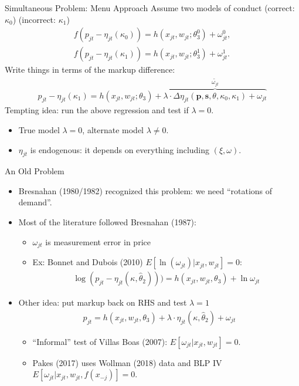 \documentclass[xcolor=pdftex,dvipsnames,table,mathserif,aspectratio=169]{beamer}
\begin{document}
\begin{frame}{Simultaneous Problem: Menu Approach}
Assume two models of conduct (correct: $\kappa_0$) (incorrect: $\kappa_1$)
\begin{align*}
f(p_{jt} -\eta_{jt}(\kappa_0))= h(x_{jt},w_{jt};\theta_3^0)+  \omega_{jt}^{0},\\
f(p_{jt} -\eta_{jt}(\kappa_1))= h(x_{jt},w_{jt};\theta_3^1)+  \omega_{jt}^{1}.
\end{align*}
Write things in terms of the markup difference:
\begin{align*}
p_{jt} -\eta_{jt}(\kappa_1)= h(x_{jt},w_{jt};\theta_3)+ \overbrace{\lambda \cdot  \Delta \eta_{jt}(\mathbf{p},\mathbf{s},\theta,\kappa_0,\kappa_1) +   \omega_{jt}}^{\widetilde{\omega_{jt}}}
\end{align*}
Tempting idea: run the above regression and test if $\lambda=0$.
\begin{itemize}
\item True model $\lambda=0$, alternate model $\lambda \neq 0$. \pause
\item $\eta_{jt}$ is \alert{endogenous}: it depends on everything including $(\xi,\omega)$.
\end{itemize}
\end{frame}


\begin{frame}{An Old Problem}
\begin{itemize}
\item Bresnahan (1980/1982) recognized this problem: we need ``rotations of demand''.
\item Most of the literature followed Bresnahan (1987):
\begin{itemize}
\item $\omega_{jt}$ is \alert{measurement error in price} 
\item Ex: Bonnet and Dubois (2010) $E[\ln(\omega_{jt}) | x_{jt},w_{jt}]=0$:
\begin{align*}
\log(p_{jt} -\eta_{jt}(\kappa,\widehat{\theta}_2))) = h(x_{jt},w_{jt},\theta_3) + \ln \omega_{jt}
\end{align*}
\end{itemize}
\item Other idea: put markup back on RHS and test $\lambda=1$
\begin{align*}
p_{jt} = h(x_{jt},w_{jt},\theta_3)+ \lambda\cdot  \eta_{jt}(\kappa,\widehat{\theta}_2)+ \omega_{jt}
\end{align*}
\begin{itemize}
\item ``Informal'' test of Villas Boas (2007): $E[\omega_{jt} | x_{jt},w_{jt}]=0$.
\item Pakes (2017) uses Wollman (2018) data and BLP IV $E[\omega_{jt} | x_{jt},w_{jt},f(x_{-j})]=0$.
\end{itemize}
\end{itemize}
\end{frame}
\end{document}
